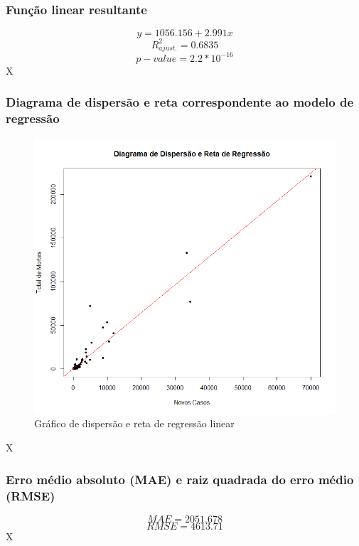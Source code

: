 \documentclass[conference]{IEEEtran}
\begin{document}
\subsubsection{Função linear resultante}
\begin{equation}
y = 1056.156 + 2.991x\label{3a_equation}
\end{equation}
\begin{equation}
R^{2}_{ajust.} = 0.6835\label{3a_r2ajust}
\end{equation}
\begin{equation}
p-value = 2.2*10^{-16}\label{3a_pvalue}
\end{equation}
X

\subsubsection{Diagrama de dispersão e reta correspondente ao modelo de regressão}
\begin{figure}[htbp]
\centerline{\includegraphics[width=0.95\columnwidth]{images/03.png}}
\caption{Gráfico de dispersão e reta de regressão linear}
\label{3a}
\end{figure}
X

\subsubsection{Erro médio absoluto (MAE) e raiz quadrada do erro médio (RMSE)}
\begin{equation}
MAE = 2051.678\label{3a_r2ajust}
\end{equation}
\begin{equation}
RMSE = 4613.71\label{3a_pvalue}
\end{equation}
X
\end{document}
